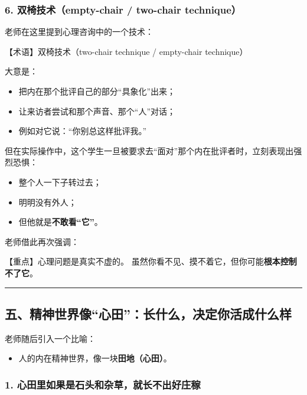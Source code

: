 \documentclass[
  chinese,
  9pt,
  a4paper,
]{ctexart}
\providecommand{\tightlist}{%
  \setlength{\itemsep}{0pt}\setlength{\parskip}{0pt}}
\begin{document}
\subsubsection{6. 双椅技术（empty-chair / two-chair
technique）}\label{ux53ccux6905ux6280ux672fempty-chair-two-chair-technique}

老师在这里提到心理咨询中的一个技术：

【术语】双椅技术（two-chair technique / empty-chair technique）

大意是：

\begin{itemize}
\tightlist
\item
  把内在那个批评自己的部分``具象化''出来；
\item
  让来访者尝试和那个声音、那个``人''对话；
\item
  例如对它说：``你别总这样批评我。''
\end{itemize}

但在实际操作中，这个学生一旦被要求去``面对''那个内在批评者时，立刻表现出强烈恐惧：

\begin{itemize}
\tightlist
\item
  整个人一下子转过去；
\item
  明明没有外人；
\item
  但他就是\textbf{不敢看``它''}。
\end{itemize}

老师借此再次强调：

【重点】心理问题是真实不虚的。
虽然你看不见、摸不着它，但你可能\textbf{根本控制不了它}。

\begin{center}\rule{0.5\linewidth}{0.5pt}\end{center}

\subsection{五、精神世界像``心田''：长什么，决定你活成什么样}\label{ux4e94ux7cbeux795eux4e16ux754cux50cfux5fc3ux7530ux957fux4ec0ux4e48ux51b3ux5b9aux4f60ux6d3bux6210ux4ec0ux4e48ux6837}

老师随后引入一个比喻：

\begin{itemize}
\tightlist
\item
  人的内在精神世界，像一块\textbf{田地（心田）}。
\end{itemize}

\subsubsection{1.
心田里如果是石头和杂草，就长不出好庄稼}\label{ux5fc3ux7530ux91ccux5982ux679cux662fux77f3ux5934ux548cux6742ux8349ux5c31ux957fux4e0dux51faux597dux5e84ux7a3c}
\end{document}
